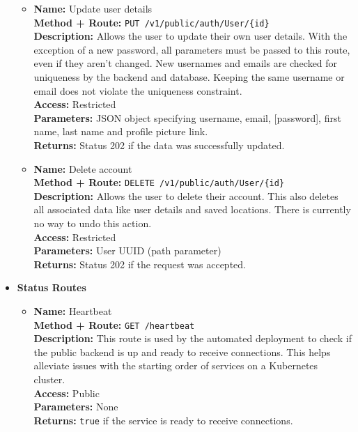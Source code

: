 \begin{itemize}
{\begin{itemize}
{        user.\\
      }
      \item {
        \textbf{Name:} Update user details\\
        \textbf{Method + Route:} \texttt{PUT /v1/public/auth/User/\{id\}}\\
        \textbf{Description:} Allows the user to update their own user details.
        With the exception of a new password, all parameters must be passed to
        this route, even if they aren't changed. New usernames and emails are
        checked for uniqueness by the backend and database. Keeping the same
        username or email does not violate the uniqueness constraint.\\
        \textbf{Access:} Restricted\\
        \textbf{Parameters:} JSON object specifying username, email, [password],
        first name, last name and profile picture link.\\
        \textbf{Returns:} Status 202 if the data was successfully updated.\\
      }
      \item {
        \textbf{Name:} Delete account\\
        \textbf{Method + Route:} \texttt{DELETE /v1/public/auth/User/\{id\}}\\
        \textbf{Description:} Allows the user to delete their account. This also
        deletes all associated data like user details and saved locations. There
        is currently no way to undo this action.\\
        \textbf{Access:} Restricted\\
        \textbf{Parameters:} User UUID (path parameter)\\
        \textbf{Returns:} Status 202 if the request was accepted.\\
      }
    \end{itemize}
  }
  \item{
    \textbf{Status Routes}
    \begin{itemize}
      \item {
        \textbf{Name:} Heartbeat\\
        \textbf{Method + Route:} \texttt{GET /heartbeat}\\
        \textbf{Description:} This route is used by the automated deployment to
        check if the public backend is up and ready to receive connections. This
        helps alleviate issues with the starting order of services on a
        Kubernetes cluster.\\
        \textbf{Access:} Public\\
        \textbf{Parameters:} None\\
        \textbf{Returns:} \texttt{true} if the service is ready to receive
        connections.\\
    }
    \end{itemize}
  }

\end{itemize}

